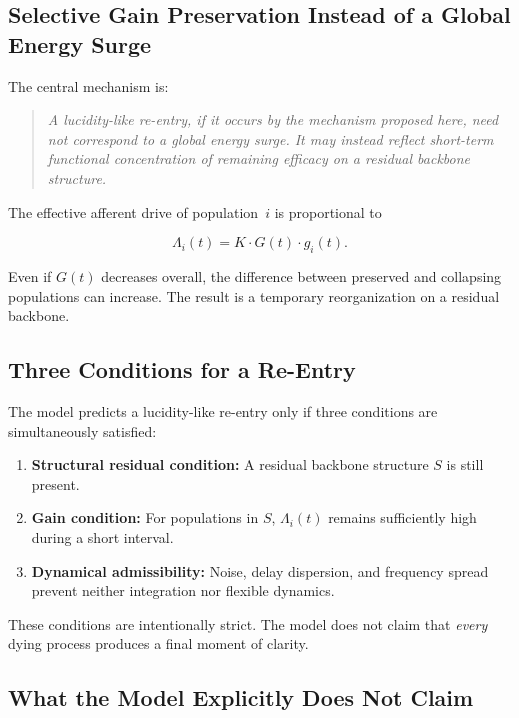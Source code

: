 \documentclass[11pt,a4paper]{article}
\theoremstyle{plain}
\theoremstyle{definition}
\theoremstyle{remark}
\begin{document}
\subsection{Selective Gain Preservation Instead of a Global Energy Surge}

The central mechanism is:

\begin{quote}
\itshape
A lucidity-like re-entry, if it occurs by the mechanism proposed here, need not correspond to a global energy surge. It may instead reflect short-term functional concentration of remaining efficacy on a residual backbone structure.
\end{quote}

The effective afferent drive of population~$i$ is proportional to

\begin{equation}
\label{eq:Lambda}
\Lambda_i(t) = K \cdot G(t) \cdot g_i(t).
\end{equation}

Even if $G(t)$ decreases overall, the difference between preserved and collapsing populations can increase. The result is a temporary reorganization on a residual backbone.

\subsection{Three Conditions for a Re-Entry}

The model predicts a lucidity-like re-entry only if three conditions are simultaneously satisfied:

\begin{enumerate}
\item \textbf{Structural residual condition:} A residual backbone structure $S$ is still present.
\item \textbf{Gain condition:} For populations in $S$, $\Lambda_i(t)$ remains sufficiently high during a short interval.
\item \textbf{Dynamical admissibility:} Noise, delay dispersion, and frequency spread prevent neither integration nor flexible dynamics.
\end{enumerate}

These conditions are intentionally strict. The model does not claim that \emph{every} dying process produces a final moment of clarity.

\subsection{What the Model Explicitly Does Not Claim}
\end{document}
